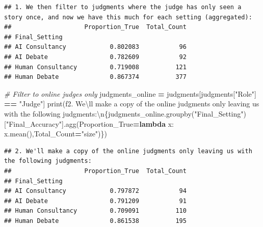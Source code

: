 \documentclass[
]{article}
\newenvironment{Shaded}{\begin{snugshade}}{\end{snugshade}}
\newcommand{\BuiltInTok}[1]{#1}
\newcommand{\CharTok}[1]{\textcolor[rgb]{0.31,0.60,0.02}{#1}}
\newcommand{\CommentTok}[1]{\textcolor[rgb]{0.56,0.35,0.01}{\textit{#1}}}
\newcommand{\KeywordTok}[1]{\textcolor[rgb]{0.13,0.29,0.53}{\textbf{#1}}}
\newcommand{\NormalTok}[1]{#1}
\newcommand{\OperatorTok}[1]{\textcolor[rgb]{0.81,0.36,0.00}{\textbf{#1}}}
\newcommand{\SpecialCharTok}[1]{\textcolor[rgb]{0.00,0.00,0.00}{#1}}
\newcommand{\SpecialStringTok}[1]{\textcolor[rgb]{0.31,0.60,0.02}{#1}}
\newcommand{\StringTok}[1]{\textcolor[rgb]{0.31,0.60,0.02}{#1}}
\begin{document}
\begin{verbatim}
## 1. We then filter to judgments where the judge has only seen a story once, and now we have this much for each setting (aggregated):
##                    Proportion_True  Total_Count
## Final_Setting                                  
## AI Consultancy            0.802083           96
## AI Debate                 0.782609           92
## Human Consultancy         0.719008          121
## Human Debate              0.867374          377
\end{verbatim}

\begin{Shaded}
\begin{Highlighting}[]
\CommentTok{\# Filter to online judges only}
\NormalTok{judgments\_online }\OperatorTok{=}\NormalTok{ judgments[judgments[}\StringTok{"Role"}\NormalTok{] }\OperatorTok{==} \StringTok{"Judge"}\NormalTok{]}
\BuiltInTok{print}\NormalTok{(}\SpecialStringTok{f\textquotesingle{}2. We}\CharTok{\textbackslash{}\textquotesingle{}}\SpecialStringTok{ll make a copy of the online judgments only leaving us with the following judgments:}\CharTok{\textbackslash{}n}\SpecialCharTok{\{}\NormalTok{judgments\_online}\SpecialCharTok{.}\NormalTok{groupby(}\StringTok{"Final\_Setting"}\NormalTok{)[}\StringTok{"Final\_Accuracy"}\NormalTok{]}\SpecialCharTok{.}\NormalTok{agg(Proportion\_True}\OperatorTok{=}\KeywordTok{lambda}\NormalTok{ x: x.mean(),Total\_Count}\OperatorTok{=}\StringTok{"size"}\NormalTok{)}\SpecialCharTok{\}}\SpecialStringTok{\textquotesingle{}}\NormalTok{)}
\end{Highlighting}
\end{Shaded}

\begin{verbatim}
## 2. We'll make a copy of the online judgments only leaving us with the following judgments:
##                    Proportion_True  Total_Count
## Final_Setting                                  
## AI Consultancy            0.797872           94
## AI Debate                 0.791209           91
## Human Consultancy         0.709091          110
## Human Debate              0.861538          195
\end{verbatim}
\end{document}
